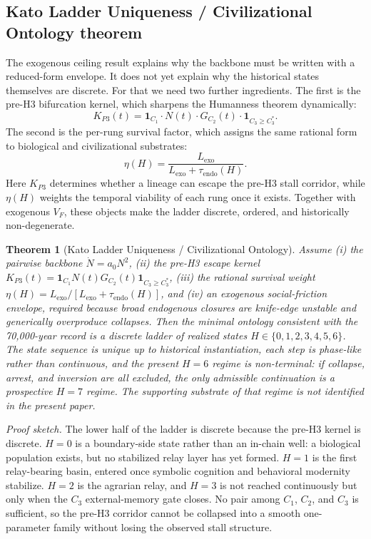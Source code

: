 \documentclass[11pt]{article}
\newtheorem{theorem}{Theorem}[section]
\begin{document}
\subsection{Kato Ladder Uniqueness / Civilizational Ontology theorem}

The exogenous ceiling result explains why the backbone must be written with a reduced-form envelope.
It does not yet explain why the historical states themselves are discrete.
For that we need two further ingredients.
The first is the pre-H3 bifurcation kernel,
which sharpens the Humanness theorem dynamically:
\begin{equation}
K_{P3}(t)=\mathbf{1}_{C_1}\cdot N(t)\cdot G_{C_2}(t)\cdot \mathbf{1}_{C_3\ge C_3^{\ast}}.
\label{eq:kp3}
\end{equation}
The second is the per-rung survival factor,
which assigns the same rational form to biological and civilizational substrates:
\begin{equation}
\eta(H)=\frac{L_{\mathrm{exo}}}{L_{\mathrm{exo}}+\tau_{\mathrm{endo}}(H)}.
\label{eq:eta_main}
\end{equation}
Here \(K_{P3}\) determines whether a lineage can escape the pre-H3 stall corridor,
while \(\eta(H)\) weights the temporal viability of each rung once it exists.
Together with exogenous \(V_F\),
these objects make the ladder discrete,
ordered,
and historically non-degenerate.

\begin{theorem}[Kato Ladder Uniqueness / Civilizational Ontology]
\label{thm:ladder-uniqueness}
Assume
(i) the pairwise backbone
\(\dot N=a_0N^2\),
(ii) the pre-H3 escape kernel
\(K_{P3}(t)=\mathbf{1}_{C_1}N(t)G_{C_2}(t)\mathbf{1}_{C_3\ge C_3^{\ast}}\),
(iii) the rational survival weight
\(\eta(H)=L_{\mathrm{exo}}/[L_{\mathrm{exo}}+\tau_{\mathrm{endo}}(H)]\),
and
(iv) an exogenous social-friction envelope,
required because broad endogenous closures are knife-edge unstable and generically overproduce collapses.
Then the minimal ontology consistent with the 70,000-year record is a discrete ladder of realized states
\(H\in\{0,1,2,3,4,5,6\}\).
The state sequence is unique up to historical instantiation,
each step is phase-like rather than continuous,
and the present \(H{=}6\) regime is non-terminal:
if collapse,
arrest,
and inversion are all excluded,
the only admissible continuation is a prospective \(H{=}7\) regime.
The supporting substrate of that regime is not identified in the present paper.
\end{theorem}

\noindent\textit{Proof sketch.}
The lower half of the ladder is discrete because the pre-H3 kernel is discrete.
\(H{=}0\) is a boundary-side state rather than an in-chain well:
a biological population exists,
but no stabilized relay layer has yet formed.
\(H{=}1\) is the first relay-bearing basin,
entered once symbolic cognition and behavioral modernity stabilize.
\(H{=}2\) is the agrarian relay,
and \(H{=}3\) is not reached continuously but only when the
\(C_3\) external-memory gate closes.
No pair among
\(C_1\),
\(C_2\),
and \(C_3\)
is sufficient,
so the pre-H3 corridor cannot be collapsed into a smooth one-parameter family without losing the observed stall structure.
\end{document}
